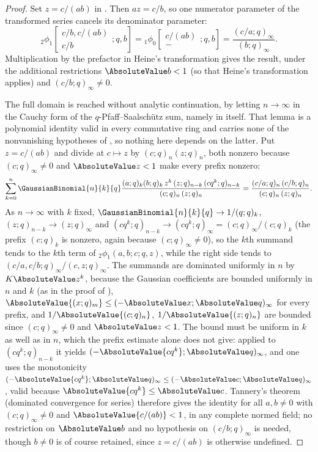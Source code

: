 \documentclass[11pt,a4paper,oneside,openany]{book}
\theoremstyle{definition}
\theoremstyle{remark}
\begin{document}
\begin{proof}
Set $z=c/(ab)$ in .  Then $az=c/b$, so one numerator parameter of the transformed series cancels its denominator parameter:
\[
 {}_2\phi_1\!\left[\begin{matrix}c/b,c/(ab)\\c/b\end{matrix};q,b\right]
 ={}_1\phi_0\!\left[\begin{matrix}c/(ab)\\-\end{matrix};q,b\right]
 =\frac{(c/a;q)_\infty}{(b;q)_\infty}.
\]
Multiplication by the prefactor in Heine's transformation gives the result, under the
additional restrictions $\AbsoluteValue b<1$ (so that Heine's transformation applies) and
$(c/b;q)_\infty\ne0$.

The full domain is reached without analytic continuation, by letting $n\to\infty$ in the
Cauchy form of the $q$-Pfaff--Saalsch\"utz sum, namely in  itself.  That
lemma is a polynomial identity valid in every commutative ring and carries none of the
nonvanishing hypotheses of , so nothing here depends on the latter.  Put
$z=c/(ab)$ and divide  at $c\mapsto z$ by $(c;q)_n(z;q)_n$, both nonzero
because $(c;q)_\infty\ne0$ and $\AbsoluteValue z<1$ make every prefix nonzero:
\[
 \sum_{k=0}^{n}\GaussianBinomial{n}{k}{q}
 \frac{(a;q)_k(b;q)_k\,z^{k}\,(z;q)_{n-k}\,(cq^{k};q)_{n-k}}{(c;q)_n\,(z;q)_n}
 =\frac{(c/a;q)_n\,(c/b;q)_n}{(c;q)_n\,(z;q)_n}.
\]
As $n\to\infty$ with $k$ fixed, $\GaussianBinomial{n}{k}{q}\to1/(q;q)_k$,
$(z;q)_{n-k}\to(z;q)_\infty$ and $(cq^{k};q)_{n-k}\to(cq^{k};q)_\infty=(c;q)_\infty/(c;q)_k$
(the prefix $(c;q)_k$ is nonzero, again because $(c;q)_\infty\ne0$),
so the $k$th summand tends to the $k$th term of ${}_2\phi_1(a,b;c;q,z)$, while the right
side tends to $(c/a,c/b;q)_\infty/(c,z;q)_\infty$.  The summands are dominated uniformly in
$n$ by $K\AbsoluteValue z^{k}$, because the Gaussian coefficients are bounded uniformly in
$n$ and $k$ (as in the proof of ),
$\AbsoluteValue{(x;q)_m}\le(-\AbsoluteValue x;\AbsoluteValue q)_\infty$ for every prefix,
and $1/\AbsoluteValue{(c;q)_n}$, $1/\AbsoluteValue{(z;q)_n}$ are bounded since
$(c;q)_\infty\ne0$ and $\AbsoluteValue z<1$.  The bound must be uniform in $k$ as well as in
$n$, which the prefix estimate alone does not give: applied to $(cq^{k};q)_{n-k}$ it yields
$(-\AbsoluteValue{cq^{k}};\AbsoluteValue q)_\infty$, and one uses the monotonicity
$(-\AbsoluteValue{cq^{k}};\AbsoluteValue q)_\infty\le(-\AbsoluteValue c;\AbsoluteValue q)_\infty$,
valid because $\AbsoluteValue{cq^{k}}\le\AbsoluteValue c$.  Tannery's theorem (dominated
convergence for series) therefore gives the identity for all $a,b\ne0$ with $(c;q)_\infty\ne0$
and $\AbsoluteValue{c/(ab)}<1$, in any complete normed field; no restriction on
$\AbsoluteValue b$ and no hypothesis on $(c/b;q)_\infty$ is needed, though $b\ne0$ is of course
retained, since $z=c/(ab)$ is otherwise undefined.
\end{proof}
\end{document}
